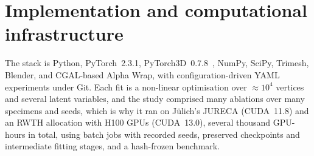 \section{Implementation and computational infrastructure}
\label{sec:infrastructure}

The stack is Python, PyTorch~2.3.1, PyTorch3D~0.7.8~\cite{pytorch3d}, NumPy,
SciPy, Trimesh, Blender, and CGAL-based Alpha Wrap, with configuration-driven
YAML experiments under Git. Each fit is a non-linear optimisation over
$\approx10^4$ vertices and several latent variables, and the study comprised
many ablations over many specimens and seeds, which is why it ran on
J\"ulich's JURECA (CUDA~11.8) and an RWTH allocation with H100 GPUs
(CUDA~13.0), several thousand GPU-hours in total, using batch jobs with
recorded seeds, preserved checkpoints and intermediate fitting stages, and a
hash-frozen benchmark.
